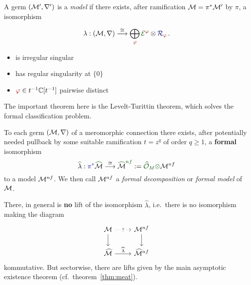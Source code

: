 \begin{defn}\label{defn:model}
  \def\myPhi{\textcolor{red!60!black}{\phi}}
  \def\myE{\textcolor{green!40!black}{\cE^{\myPhi}}}
  A germ $(\mathcal{M}',\nabla')$ is a \emph{model} if there exists, after ramification
  $\mathcal{M}=\pi^*\mathcal{M}'$ by $\pi$, a isomorphism
  \begin{multicols}{2}
    \[
      \lambda:(\cM,\nabla)
      \overset{\cong}{\longrightarrow}
      \bigoplus_{~\tikzmark{e3}\!\!\myPhi}
      \overset{\tikzmark{e2}}{\myE}
      \otimes
      \overset{\tikzmark{e1}}{\textcolor{blue!40!black}{\cR_{\myPhi}}}
      \,.
    \]
    \columnbreak{}
    \begin{itemize}
      \item[\tikzmarkb{n2}{green}] is irregular singular
      \item[\tikzmarkc{n1}{blue}] has regular singularity at $\{0\}$
      \item[\tikzmarkc{n3}{red}] $\myPhi\in t^{-1}\C[t^{-1}]$ pairwise distinct
    \end{itemize}
  \end{multicols}
\end{defn}
The important theorem here is the Levelt-Turittin theorem, which solves the
formal classification problem.
\begin{thm}\label{thm:leveltTurittin}
  To each germ $(\mathcal{M},\nabla)$ of a meromorphic connection there exists, after
  potentially needed \textcolor{blue!60!black}{pullback by some suitable
  ramification $t=z^q$ of order $q\geq1$}, a
  \textcolor{green!30!black}{\textbf{formal}} isomorphism
  \[
    \textcolor{green!30!black}{\hat{\textcolor{black}{\lambda}}}:
    \textcolor{blue!60!black}{\pi^{*}}
    \textcolor{green!30!black}{\hat{\textcolor{black}{\cM}}}
    \overset{\cong}\longrightarrow
    \textcolor{green!30!black}{\hat{\textcolor{black}{\cM}}^{nf}}
    :=\textcolor{green!30!black}{\hat\cO_M\otimes}\cM^{nf}
  \]
  to a model $\mathcal{M}^{nf}$.
  We then call $\mathcal{M}^{nf}$ a \emph{formal decomposition} or \emph{formal model}
  of $\mathcal{M}$.
  \begin{rem}
    There, in general is \textbf{no} lift of the isomorphism $\hat\lambda$,
    i.e.\ there is no isomorphism making the diagram
    \[ \begin{tikzcd}
        \cM \dar \arrow[dotted]{r}[description]{?} & \cM^{nf} \dar
        \\\hat\cM \rar{\hat\lambda} & \hat\cM^{nf}
    \end{tikzcd} \]
    kommutative.
    But sectorwise, there are lifts given by the main asymptotic existence
    theorem (cf.\ theorem~\ref{thm:meat}).
  \end{rem}
\end{thm}
